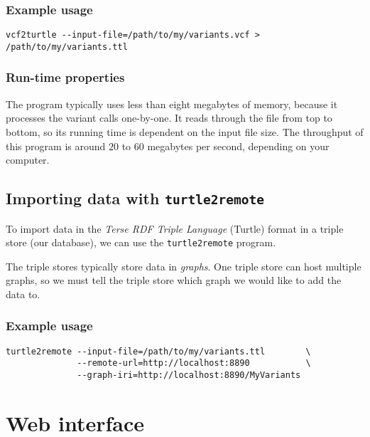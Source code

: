 \documentclass[11pt,a4paper,oneside]{book}
\begin{document}
\subsection{Example usage}

\begin{siderules}
\begin{verbatim}
vcf2turtle --input-file=/path/to/my/variants.vcf > /path/to/my/variants.ttl
\end{verbatim}
\end{siderules}

\subsection{Run-time properties}

  The program typically uses less than eight megabytes of memory, because it
  processes the variant calls one-by-one.  It reads through the file from top
  to bottom, so its running time is dependent on the input file size.  The
  throughput of this program is around $20$ to $60$ megabytes per second,
  depending on your computer.

\section{Importing data with \texttt{turtle2remote}}
\label{sec:turtle2remote}

  To import data in the \emph{Terse RDF Triple Language} (Turtle) format in
  a triple store (our database), we can use the \texttt{turtle2remote} program.

  The triple stores typically store data in \emph{graphs}.  One triple store
  can host multiple graphs, so we must tell the triple store which graph we
  would like to add the data to.

\subsection{Example usage}

\begin{siderules}
\begin{verbatim}
turtle2remote --input-file=/path/to/my/variants.ttl        \
              --remote-url=http://localhost:8890           \
              --graph-iri=http://localhost:8890/MyVariants
\end{verbatim}
\end{siderules}

\chapter{Web interface}
\label{chap:web-interface}
\end{document}
